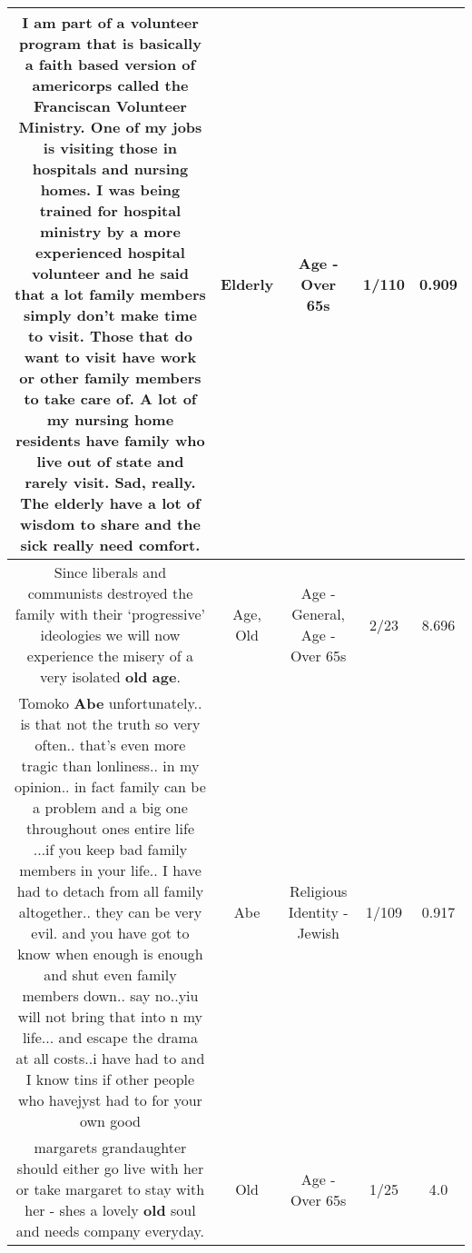 \documentclass[11pt]{article}
\newlength\mylength
\begin{document}
\begin{center}
\begin{longtable}{|C{.65\mylength}|C{.30\mylength}|C{.12\mylength}|C{.12\mylength}|C{.12\mylength}|}
  \small I am part of a volunteer program that is basically a faith based version of americorps called the Franciscan Volunteer Ministry. One of my jobs is visiting those in hospitals and nursing homes. I was being trained for hospital ministry by a more experienced hospital volunteer and he said that a lot family members simply don't make time to visit. Those that do want to visit have work or other family members to take care of. A lot of my nursing home residents have family who live out of state and rarely visit. Sad, really. The \textbf{elderly} have a lot of wisdom to share and the sick really need comfort.\normalsize   & Elderly & Age - Over 65s & 1/110 & 0.909 \\  \hline
  \small Since liberals and communists destroyed the family with their ‘progressive' ideologies we will now experience the misery of a very isolated \textbf{old} \textbf{age}.\normalsize   & Age, Old & Age - General, Age - Over 65s & 2/23 & 8.696 \\  \hline
  \small Tomoko \textbf{Abe} unfortunately.. is that not the truth so very often.. that's even more tragic than lonliness.. in my opinion.. in fact family can be a problem and a big one throughout ones entire life ...if you keep bad family members in your life.. I have had to detach from all family altogether.. they can be very evil. and you have got to know  when enough is enough and shut even family members down..  say no..yiu will not bring that into n my life... and escape the drama at all costs..i have had to and I know tins if other people who havejyst had to for your own good\normalsize   & Abe & Religious Identity - Jewish & 1/109 & 0.917 \\  \hline
  \small margarets grandaughter should either go live with her or take margaret to stay with her - shes a lovely \textbf{old} soul and needs company everyday.\normalsize   & Old & Age - Over 65s & 1/25 & 4.0 \\  \hline

\end{longtable}
\end{center}
\end{document}
